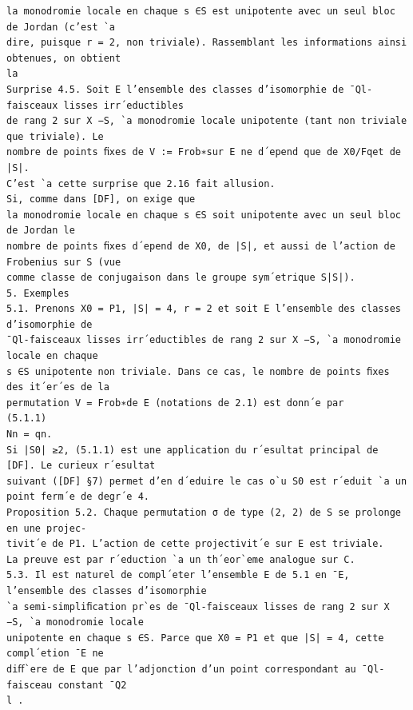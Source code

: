 \documentclass[11pt]{article}
\begin{document}
\begin{Verbatim}[breaklines=true,fontsize=\small]
la monodromie locale en chaque s ∈S est unipotente avec un seul bloc de Jordan (c’est `a
dire, puisque r = 2, non triviale). Rassemblant les informations ainsi obtenues, on obtient
la
Surprise 4.5. Soit E l’ensemble des classes d’isomorphie de ¯Ql-faisceaux lisses irr´eductibles
de rang 2 sur X −S, `a monodromie locale unipotente (tant non triviale que triviale). Le
nombre de points ﬁxes de V := Frob∗sur E ne d´epend que de X0/Fqet de |S|.
C’est `a cette surprise que 2.16 fait allusion.
Si, comme dans [DF], on exige que
la monodromie locale en chaque s ∈S soit unipotente avec un seul bloc de Jordan le
nombre de points ﬁxes d´epend de X0, de |S|, et aussi de l’action de Frobenius sur S (vue
comme classe de conjugaison dans le groupe sym´etrique S|S|).
5. Exemples
5.1. Prenons X0 = P1, |S| = 4, r = 2 et soit E l’ensemble des classes d’isomorphie de
¯Ql-faisceaux lisses irr´eductibles de rang 2 sur X −S, `a monodromie locale en chaque
s ∈S unipotente non triviale. Dans ce cas, le nombre de points ﬁxes des it´er´es de la
permutation V = Frob∗de E (notations de 2.1) est donn´e par
(5.1.1)
Nn = qn.
Si |S0| ≥2, (5.1.1) est une application du r´esultat principal de [DF]. Le curieux r´esultat
suivant ([DF] §7) permet d’en d´eduire le cas o`u S0 est r´eduit `a un point ferm´e de degr´e 4.
Proposition 5.2. Chaque permutation σ de type (2, 2) de S se prolonge en une projec-
tivit´e de P1. L’action de cette projectivit´e sur E est triviale.
La preuve est par r´eduction `a un th´eor`eme analogue sur C.
5.3. Il est naturel de compl´eter l’ensemble E de 5.1 en ¯E, l’ensemble des classes d’isomorphie
`a semi-simpliﬁcation pr`es de ¯Ql-faisceaux lisses de rang 2 sur X −S, `a monodromie locale
unipotente en chaque s ∈S. Parce que X0 = P1 et que |S| = 4, cette compl´etion ¯E ne
diﬀ`ere de E que par l’adjonction d’un point correspondant au ¯Ql-faisceau constant ¯Q2
l .


\end{Verbatim}
\end{document}
